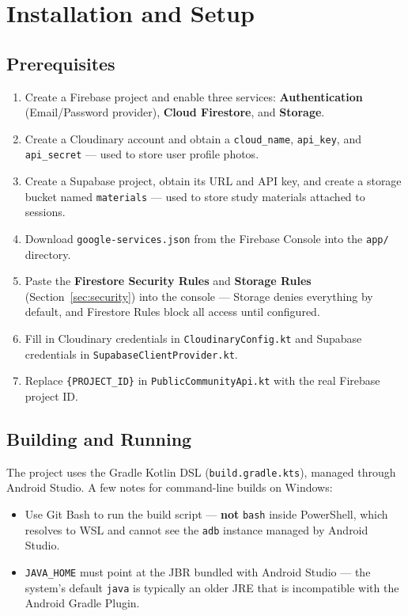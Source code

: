 \section{Installation and Setup}

\subsection{Prerequisites}

\begin{enumerate}
    \item Create a Firebase project and enable three services: \textbf{Authentication} (Email/Password provider), \textbf{Cloud Firestore}, and \textbf{Storage}.
    \item Create a Cloudinary account and obtain a \texttt{cloud\_name}, \texttt{api\_key}, and \texttt{api\_secret} — used to store user profile photos.
    \item Create a Supabase project, obtain its URL and API key, and create a storage bucket named \texttt{materials} — used to store study materials attached to sessions.
    \item Download \texttt{google-services.json} from the Firebase Console into the \texttt{app/} directory.
    \item Paste the \textbf{Firestore Security Rules} and \textbf{Storage Rules} (Section~\ref{sec:security}) into the console — Storage denies everything by default, and Firestore Rules block all access until configured.
    \item Fill in Cloudinary credentials in \texttt{CloudinaryConfig.kt} and Supabase credentials in \texttt{SupabaseClientProvider.kt}.
    \item Replace \texttt{\{PROJECT\_ID\}} in \texttt{PublicCommunityApi.kt} with the real Firebase project ID.
\end{enumerate}

\subsection{Building and Running}

The project uses the Gradle Kotlin DSL (\texttt{build.gradle.kts}), managed through Android Studio. A few notes for command-line builds on Windows:

\begin{itemize}
    \item Use Git Bash to run the build script — \textbf{not} \texttt{bash} inside PowerShell, which resolves to WSL and cannot see the \texttt{adb} instance managed by Android Studio.
    \item \texttt{JAVA\_HOME} must point at the JBR bundled with Android Studio — the system's default \texttt{java} is typically an older JRE that is incompatible with the Android Gradle Plugin.
\end{itemize}

